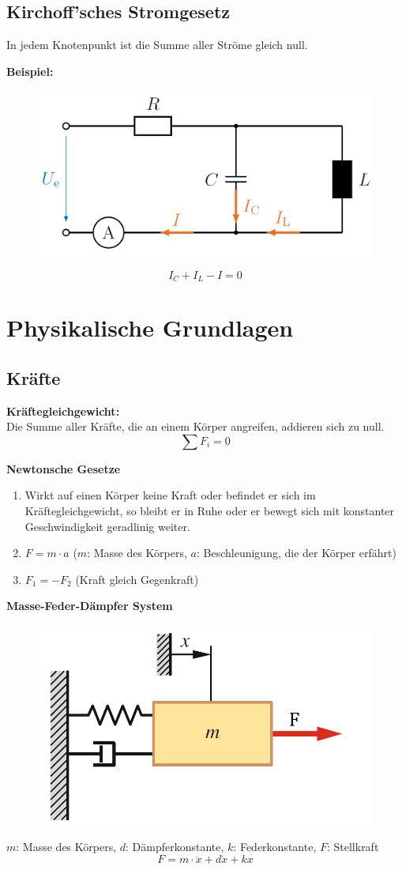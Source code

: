 \documentclass[10pt,a4paper]{article}
\newcommand{\tab}[1][1]{\hspace*{#1cm}}
\begin{document}
\subsection{Kirchoff'sches Stromgesetz}
In jedem Knotenpunkt ist die Summe aller Ströme gleich null.

\textbf{Beispiel:}
\begin{figure}[H]
	\includegraphics[width=0.5\columnwidth]{imgs/kcl.png}
\end{figure}
$$
	I_C + I_L - I = 0
$$

\section{Physikalische Grundlagen}
\subsection{Kräfte}
\textbf{Kräftegleichgewicht:} \\
Die Summe aller Kräfte, die an einem Körper angreifen, addieren sich zu null.
$$
	\sum F_i = 0
$$

\textbf{Newtonsche Gesetze}
\begin{enumerate}
	\item Wirkt auf einen Körper keine Kraft oder befindet er sich im Kräftegleichgewicht, so bleibt er in Ruhe oder er bewegt sich mit konstanter Geschwindigkeit geradlinig weiter.
	\item $F = m ⋅ a$ \tab[2] ($m$: Masse des Körpers, $a$: Beschleunigung, die der Körper erfährt)
	\item $F_1 = -F_2$ \tab[2] (Kraft gleich Gegenkraft)
\end{enumerate}

\textbf{Masse-Feder-Dämpfer System}
\begin{figure}[H]
	\includegraphics[width=0.5\columnwidth]{imgs/mass-spring-damper.png}
\end{figure}
$m$: Masse des Körpers, $d$: Dämpferkonstante, $k$: Federkonstante, $F$: Stellkraft
$$
	F = m ⋅ \ddot x + d \dot x + k x
$$
\end{document}
